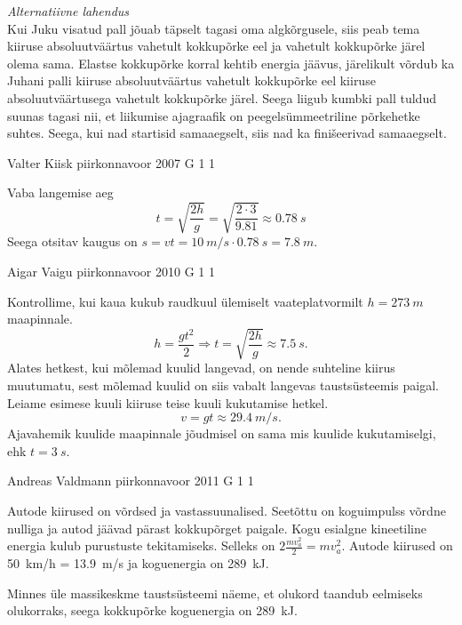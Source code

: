 \documentclass[11pt]{article}
\begin{document}
{{\vspace{0.5\baselineskip}

\emph{Alternatiivne lahendus}\\
Kui Juku visatud pall jõuab täpselt tagasi oma algkõrgusele, siis peab tema kiiruse absoluutväärtus vahetult kokkupõrke eel ja vahetult kokkupõrke järel olema sama. Elastse kokkupõrke korral kehtib energia jäävus, järelikult võrdub ka Juhani palli kiiruse absoluutväärtus vahetult kokkupõrke eel kiiruse absoluutväärtusega vahetult kokkupõrke järel. Seega liigub kumbki pall tuldud suunas tagasi nii, et liikumise ajagraafik on peegelsümmeetriline põrkehetke suhtes. Seega, kui nad startisid samaaegselt, siis nad ka finišeerivad samaaegselt.
\fi
}

{Valter Kiisk} %
{piirkonnavoor} %
{2007} %
{G 1} %
{1} %
{

\ifSolution
Vaba langemise aeg
\[
t=\sqrt{\frac{2 h}{g}}=\sqrt{\frac{2 \cdot 3}{\num{9,81}}} \approx \SI{0,78}{s}
\]
Seega otsitav kaugus on $s = vt = \SI{10}{m/s} \cdot \SI{0,78}{s} = \SI{7,8}{m}$.
\fi
}

{Aigar Vaigu} %
{piirkonnavoor} %
{2010} %
{G 1} %
{1} %
{

\ifSolution
Kontrollime, kui kaua kukub raudkuul ülemiselt vaateplatvormilt $h=\SI{273}{m}$ maapinnale.
\[h=\frac{gt^2}{2} \Rightarrow t=\sqrt{\frac{2h}{g}}\approx \SI{7.5}{s}.\]
Alates hetkest, kui mõlemad kuulid langevad, on nende suhteline kiirus muutumatu, sest mõlemad kuulid on siis vabalt langevas taustsüsteemis paigal.
Leiame esimese kuuli kiiruse teise kuuli kukutamise hetkel.
\[v=gt\approx \SI{29.4}{m/s}.\]
Ajavahemik kuulide maapinnale jõudmisel on sama mis kuulide kukutamiselgi, ehk $t=\SI{3}{s}$.
\fi
}

{Andreas Valdmann} %
{piirkonnavoor} %
{2011} %
{G 1} %
{1} %
{

\ifSolution
\osa Autode kiirused on võrdsed ja vastassuunalised. Seetõttu on koguimpulss võrdne nulliga ja autod jäävad pärast kokkupõrget paigale. Kogu esialgne kineetiline energia kulub purustuste tekitamiseks. Selleks on $2 \frac{m v_{a}^{2}}{2}=m v_{a}^{2}$. Autode kiirused on \SI{50}{km/h} = \SI{13,9}{m/s} ja koguenergia on \SI{289}{kJ}.

\osa Minnes üle massikeskme taustsüsteemi näeme, et olukord taandub eelmiseks olukorraks, seega kokkupõrke koguenergia on \SI{289}{kJ}.

}}
\end{document}
